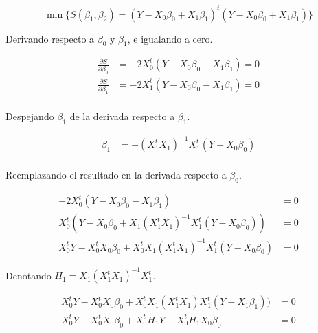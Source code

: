 \documentclass[
  11pt,
]{book}
\theoremstyle{definition}
\theoremstyle{definition}
\theoremstyle{definition}
\theoremstyle{definition}
\theoremstyle{remark}
\begin{document}
\begin{equation}
\min\lbrace S(\beta_1, \beta_2) = (Y - X_0\beta_0 + X_1\beta_1)^t(Y - X_0\beta_0 + X_1\beta_1)  \rbrace
\label{eq:RLM-clasico3}
\end{equation}

Derivando respecto a \(\beta_0\) y \(\beta_1\), e igualando a cero.

\begin{equation}
\begin{split}
\frac{\partial S}{\partial \beta_0} &= -2X^t_0(Y-X_0\beta_0-X_1\beta_1) = 0\\
\frac{\partial S}{\partial \beta_1} &= -2X^t_1(Y-X_0\beta_0-X_1\beta_1) = 0\\
\end{split}
\label{eq:RLM-clasico4}
\end{equation}

Despejando \(\beta_1\) de la derivada respecto a \(\beta_1\).

\begin{equation}
\begin{split}
\beta_1 &= -(X_1^tX_1)^{-1}X_1^t(Y-X_0\beta_0)\\
\end{split}
\label{eq:RLM-clasico5}
\end{equation}

Reemplazando el resultado en la derivada respecto a \(\beta_0\).

\begin{equation}
\begin{split}
-2X^t_0(Y-X_0\beta_0-X_1\beta_1) &= 0\\
X^t_0(Y-X_0\beta_0+X_1(X_1^tX_1)^{-1}X_1^t(Y-X_0\beta_0)) &= 0\\
X^t_0Y-X^t_0X_0\beta_0+X^t_0X_1(X_1^tX_1)^{-1}X_1^t(Y-X_0\beta_0) &= 0
\end{split}
\label{eq:RLM-clasico6}
\end{equation}

Denotando \(H_1 = X_1(X_1^tX_1)^{-1}X_1^t\).

\begin{equation}
\begin{split}
X^t_0Y-X^t_0X_0\beta_0+X^t_0X_1(X_1^tX_1)X_1^t(Y-X_1\beta_1)) &= 0\\
X^t_0Y-X^t_0X_0\beta_0+X^t_0H_1Y-X^t_0H_1X_0\beta_0 &= 0\\
\end{split}
\label{eq:RLM-clasico7}
\end{equation}
\end{document}
